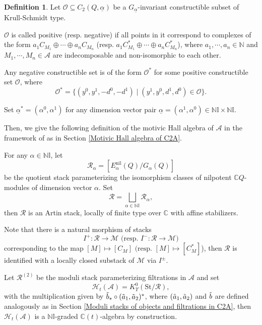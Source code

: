 \documentclass[12pt]{amsart}
\theoremstyle{definition}
\newtheorem{definition}[theorem]{Definition}
\numberwithin{equation}{section}
\begin{document}
\begin{definition}
    \label{positive or negative}
    Let $ \mathcal{O} \subseteq C_2(Q, \underline{\alpha}) $ be a $ G_{\underline{\alpha}} $-invariant constructible subset of Krull-Schmidt type. 
    
     $ \mathcal{O} $ is called positive (resp. negative) if all points in it correspond to complexes of the form $ a_1 C_{M_1} \oplus \cdots \oplus a_n C_{M_n}  $ (resp. $  a_1 C_{M_1}^* \oplus \cdots \oplus a_n C_{M_n}^* $), where $ a_1, \cdots ,a_n \in \mathbb{N} $ and $ M_1,\cdots,M_n \in \mathcal{A} $ are indecomposable and non-isomorphic to each other.

\end{definition}

Any negative constructible set is of the form $ \mathcal{O}^* $ for some positive constructible set $ \mathcal{O} $, where 
\[\mathcal{O}^* = \{(y^0,y^1,-d^0,-d^1) \mid (y^1,y^0,d^1,d^0) \in \mathcal{O}\}.\]

Set $ \underline{\alpha}^* = (\alpha^0,\alpha^1) $ for any dimension vector pair $ \underline{\alpha} = (\alpha^1,\alpha^0) \in \mathbb{N}\mathbb{I} \times \mathbb{N}\mathbb{I}$.

Then, we give the following definition of the motivic Hall algebra of $ \mathcal{A} $ in the framework of \cite{Joyce07} as in Section \ref{Motivic Hall algebra of C2A}. 

For any $ \alpha \in \mathbb{N}\mathbb{I} $, let
\[\mathcal{R}_{\alpha} = [E_{\alpha}^{\mathrm{nil}}(Q)/G_{\alpha}(Q)] \]
be the quotient stack parameterizing the isomorphism classes of nilpotent $ \mathbb{C}Q $-modules of dimension vector $ \alpha $. 
Set
\[\mathcal{R} = \bigsqcup_{\alpha \in \mathbb{N}\mathbb{I}} \mathcal{R}_{\alpha},\]
then $ \mathcal{R} $ is an Artin stack, locally of finite type over $ \mathbb{C} $ with affine stabilizers. 

Note that there is a natural morphism of stacks
\[
    I^+:\mathcal R\to \mathcal M \text{  (resp. } I^-:\mathcal R\to \mathcal M)
\]
corresponding to the map $[M]\mapsto [C_M]\text{  (resp. } [M]\mapsto [C_M^*]$), 
then $ \mathcal{R} $ is identified with a locally closed substack of $ \mathcal{M} $ via $ I^{\pm} $. 

Let $ \mathcal{R}^{(2)} $ be the moduli stack parameterizing filtrations in $ \mathcal{A} $ and set
\[\mathcal{H}_t(\mathcal{A}) =  K_{\Upsilon}^0(\mathrm{St}/\mathcal{R}), \]
with the multiplication given by $ \Tilde{b}_* \circ (\Tilde{a}_1, \Tilde{a}_2)^* $, where $ (\Tilde{a}_1, \Tilde{a}_2) $ and $ \Tilde{b} $ are defined analogously as in Section \ref{Moduli stacks of objects and filtrations in C2A}, then $ \mathcal{H}_t(\mathcal{A}) $ is a $ \mathbb{N}\mathbb{I} $-graded $ \mathbb{C}(t) $-algebra by construction. 
\end{document}
